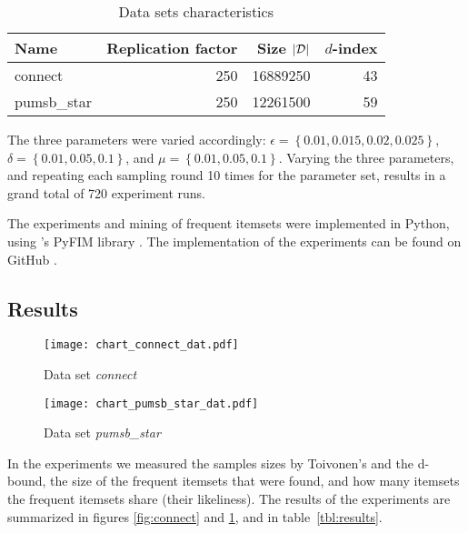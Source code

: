 \documentclass[../main.tex]{subfiles}
\begin{document}
\begin{table}[h]
    \centering
    \begin{tabular}{l r r r}
        \hline
        Name & Replication factor & Size $\lvert\mathcal{D}\rvert$ & $d$-index \\
        \hline
        connect & \num{250} & \num{16889250} & \num{43} \\
        pumsb\_star & \num{250} & \num{12261500} & \num{59} \\
        \hline
    \end{tabular}
    \caption{Data sets characteristics}
    \label{tbl:experiment_sets}
\end{table}

The three parameters were varied accordingly:
$\epsilon = \left\{ 0.01, 0.015, 0.02, 0.025 \right\}$,\\
$\delta = \left\{ 0.01, 0.05, 0.1 \right\}$, and
$\mu = \left\{ 0.01, 0.05, 0.1 \right\}$.
Varying the three parameters, and repeating each sampling round 10 times for the parameter set,
results in a grand total of \num{720} experiment runs.


The experiments and mining of frequent itemsets were implemented in Python,
using \citeauthor{Borgelt2016}'s PyFIM library \cite{Borgelt2016}.
The implementation of the experiments can be found on GitHub \cite{Robeer2017}.


\subsection{Results}
\label{sec:II_results}

\begin{figure}[bh]
    \centering
    \begin{minipage}[b]{0.48\textwidth}
        \texttt{[image: chart\_connect\_dat.pdf]}
        \caption{Data set \emph{connect}}
        \label{fig:connect}
    \end{minipage}
    \hfill
    \begin{minipage}[b]{0.48\textwidth}
        \texttt{[image: chart\_pumsb\_star\_dat.pdf]}
        \caption{Data set \emph{pumsb\_star}}
        \label{fig:pumsb_star}
    \end{minipage}
\end{figure}

In the experiments we measured the samples sizes by Toivonen's and the d-bound,
the size of the frequent itemsets that were found,
and how many itemsets the frequent itemsets share (their likeliness).
The results of the experiments are summarized in figures \ref{fig:connect} and \ref{fig:pumsb_star},
and in table~\ref{tbl:results}.
\end{document}
